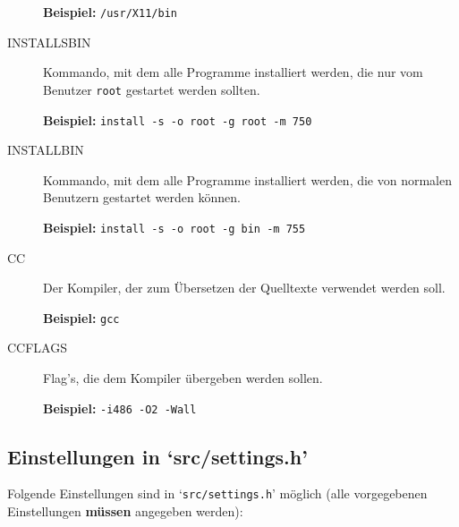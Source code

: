 \begin{description}
{\bf Beispiel:} {\tt /usr/X11/bin}



\item[INSTALLSBIN] \mbox{}



Kommando, mit dem alle Programme installiert werden, die nur vom Benutzer
{\tt root} gestartet werden sollten.

{\bf Beispiel:} {\tt install -s -o root -g root -m 750}



\item[INSTALLBIN] \mbox{}



Kommando, mit dem alle Programme installiert werden, die von normalen
Benutzern gestartet werden k\"{o}nnen.

{\bf Beispiel:} {\tt install -s -o root -g bin -m 755}



\item[CC] \mbox{}



Der Kompiler, der zum \"{U}bersetzen der Quelltexte verwendet werden soll.

{\bf Beispiel:} {\tt gcc}



\item[CCFLAGS] \mbox{}



Flag's, die dem Kompiler \"{u}bergeben werden sollen.

{\bf Beispiel:} {\tt -i486 -O2 -Wall}



\end{description}







\subsection{Einstellungen in `src/settings.h'\label{id-install-settings}}



Folgende Einstellungen sind in `{\tt src/settings.h}' m\"{o}glich (alle
vorgegebenen Einstellungen {\bf m\"{u}ssen} angegeben werden):

